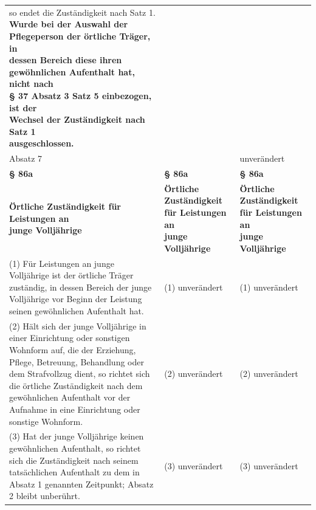 \documentclass[10pt,a4paper,landscape]{article}
\begin{document}
\begin{longtable}{|L{8.2cm}|L{8.2cm}|L{8.2cm}|}
so endet die Zuständigkeit  \newline nach Satz 1. \textbf{\textcolor{diffgreen}{Wurde bei der Auswahl der  \newline Pflegeperson der örtliche Träger, in  \newline dessen Bereich diese ihren  \newline gewöhnlichen Aufenthalt hat, nicht nach  \newline \S{} 37 Absatz 3 Satz 5 einbezogen, ist der  \newline Wechsel der Zuständigkeit nach Satz 1  \newline ausgeschlossen.}} \\
\hhline{|---|}
Absatz 7 &  & unverändert \\
\hhline{|---|}
\textbf{\S{} 86a} & \textbf{\S{} 86a} & \textbf{\S{} 86a} \\
\hhline{|---|}
\textbf{Örtliche Zuständigkeit für Leistungen an  \newline junge Volljährige} & \textbf{Örtliche Zuständigkeit für Leistungen an  \newline junge Volljährige} & \textbf{Örtliche Zuständigkeit für Leistungen an  \newline junge Volljährige} \\
\hhline{|---|}
(1) Für Leistungen an junge Volljährige ist  \newline der örtliche Träger zuständig, in dessen  \newline Bereich der junge Volljährige vor Beginn  \newline der Leistung seinen gewöhnlichen  \newline Aufenthalt hat. & (1) unverändert & (1) unverändert \\
\hhline{|---|}
(2) Hält sich der junge Volljährige in einer  \newline Einrichtung oder sonstigen Wohnform auf,  \newline die der Erziehung, Pflege, Betreuung,  \newline Behandlung oder dem Strafvollzug dient,  \newline so richtet sich die örtliche Zuständigkeit  \newline nach dem gewöhnlichen Aufenthalt vor der  \newline Aufnahme in eine Einrichtung oder  \newline sonstige Wohnform. & (2) unverändert & (2) unverändert \\
\hhline{|---|}
(3) Hat der junge Volljährige keinen  \newline gewöhnlichen Aufenthalt, so richtet sich die  \newline Zuständigkeit nach seinem tatsächlichen  \newline Aufenthalt zu dem in Absatz 1 genannten  \newline Zeitpunkt; Absatz 2 bleibt unberührt. & (3) unverändert & (3) unverändert \\

\end{longtable}
\end{document}
